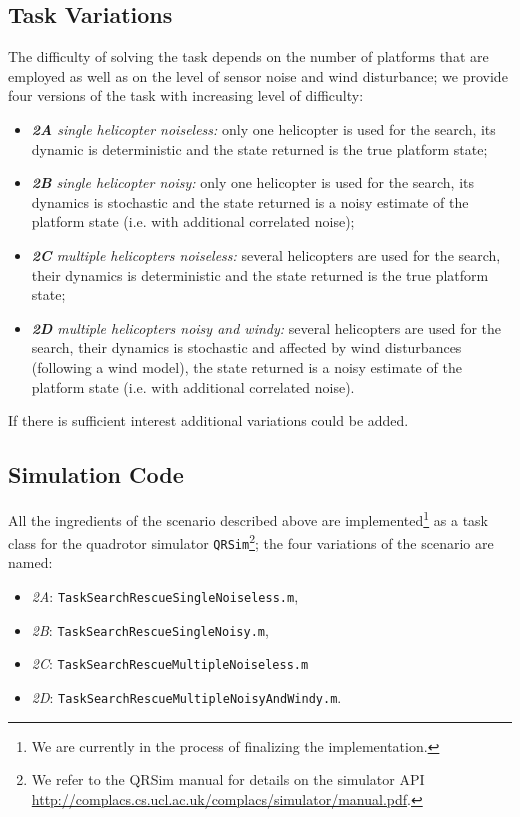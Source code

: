\documentclass{article}
\newcommand\mytexttt[1]{\texttt{\hyphenchar\font=45\relax #1}}
\newcommand{\webman}{\url{http://complacs.cs.ucl.ac.uk/complacs/simulator/manual.pdf}\xspace}
\begin{document}
\subsection{Task Variations} \label{Variations}
The difficulty of solving the task depends on the number of platforms that are employed as well as on the level of sensor noise and wind disturbance; we provide four versions of the task with increasing level of difficulty:
\begin{itemize}
 \item \textit{\textbf{2A} single helicopter noiseless:} only one helicopter is used for the search, its dynamic is deterministic and the state returned is the true platform state;
 \item \textit{\textbf{2B} single helicopter noisy:} only one helicopter is used for the search, its dynamics is stochastic and the state returned is a noisy estimate of the platform state (i.e. with additional correlated noise);
 \item \textit{\textbf{2C} multiple helicopters noiseless:} several helicopters are used for the search, their dynamics is deterministic and the state returned is the true platform state;
 \item \textit{\textbf{2D} multiple helicopters noisy and windy:} several helicopters are used for the search, their dynamics is stochastic and affected by wind disturbances (following a wind model), the state returned is a noisy estimate of the platform state (i.e. with additional correlated noise).
\end{itemize}

If there is sufficient interest additional variations could be added.

\subsection{Simulation Code} \label{SearchRescueSim}

All the ingredients of the scenario described above are implemented\footnote{We are currently in the process of finalizing the implementation.} as a task class for the quadrotor simulator \texttt{QRSim}\footnote{We refer to the QRSim manual for details on the simulator API \webman.}; the four variations of the scenario are named:
\begin{itemize}
\item\textit{2A}: \mytexttt{TaskSearchRescueSingleNoiseless.m}, 
\item\textit{2B}: \mytexttt{TaskSearchRescueSingleNoisy.m}, 
\item\textit{2C}: \mytexttt{TaskSearchRescueMultipleNoiseless.m} 
\item\textit{2D}: \mytexttt{TaskSearchRescueMultipleNoisyAndWindy.m}. 
\end{itemize}
\end{document}
